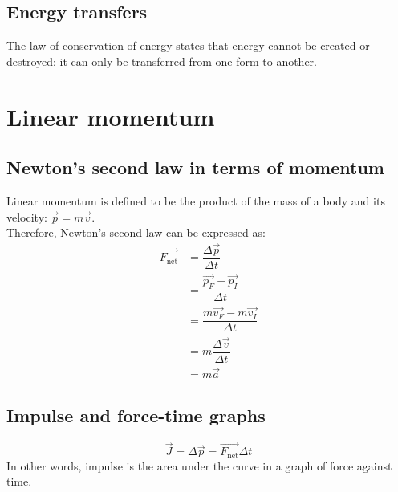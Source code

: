 \subsection{Energy transfers}
The law of conservation of energy states that energy cannot be created or destroyed: it can only be transferred from one form to another.
\section{Linear momentum}
\subsection{Newton's second law in terms of momentum}
Linear momentum is defined to be the product of the mass of a body and its velocity: \(\vec{p}=m\vec{v}\).\\
Therefore, Newton's second law can be expressed as:
$$\begin{aligned}\vec{F_\text{net}}&=\dfrac{\Delta \vec{p}}{\Delta t}\\&=\dfrac{\vec{p_F}-\vec{p_I}}{\Delta t}\\&=\dfrac{m\vec{v_F}-m\vec{v_I}}{\Delta t}\\&=m\dfrac{\Delta \vec{v}}{\Delta t}\\&=m\vec{a}\end{aligned}$$
\subsection{Impulse and force-time graphs}
\[\vec{J}=\Delta \vec{p}=\vec{F_\text{net}}\Delta t\]
In other words, impulse is the area under the curve in a graph of force against time.
